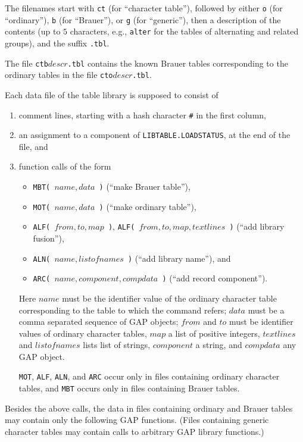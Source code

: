 \documentclass[a4paper,11pt]{report}
\begin{document}
{{{ The filenames start with \texttt{ct} (for ``character table''), followed by either \texttt{o} (for ``ordinary''), \texttt{b} (for ``Brauer''), or \texttt{g} (for ``generic''), then a description of the contents (up to $5$ characters, e.{\nobreakspace}g., \texttt{alter} for the tables of alternating and related groups), and the suffix \texttt{.tbl}. 

 The file \texttt{ctb}$descr$\texttt{.tbl} contains the known Brauer tables corresponding to the ordinary tables in the
file \texttt{cto}$descr$\texttt{.tbl}. 

 Each data file of the table library is supposed to consist of 
\begin{enumerate}
\item  comment lines, starting with a hash character \texttt{\#} in the first column, 
\item  an assignment to a component of \texttt{LIBTABLE.LOADSTATUS}, at the end of the file, and 
\item  function calls of the form 
\begin{itemize}
\item  \texttt{MBT( }$name, data$\texttt{ )} (``make Brauer table''), 
\item  \texttt{MOT( }$name, data$\texttt{ )} (``make ordinary table''), 
\item  \texttt{ALF( }$from, to, map$\texttt{ )}, \texttt{ALF( }$from, to, map, textlines$\texttt{ )} (``add library fusion''), 
\item  \texttt{ALN( }$name, listofnames$\texttt{ )} (``add library name''), and 
\item  \texttt{ARC( }$name, component, compdata$\texttt{ )} (``add record component''). 
\end{itemize}
 

 Here $name$ must be the identifier value of the ordinary character table corresponding to
the table to which the command refers; $data$ must be a comma separated sequence of \textsf{GAP} objects; $from$ and $to$ must be identifier values of ordinary character tables, $map$ a list of positive integers, $textlines$ and $listofnames$ lists list of strings, $component$ a string, and $compdata$ any \textsf{GAP} object. 

 \texttt{MOT}, \texttt{ALF}, \texttt{ALN}, and \texttt{ARC} occur only in files containing ordinary character tables, and \texttt{MBT} occurs only in files containing Brauer tables. 
\end{enumerate}
 

 Besides the above calls, the data in files containing ordinary and Brauer
tables may contain only the following \textsf{GAP} functions. (Files containing generic character tables may contain calls to
arbitrary \textsf{GAP} library functions.) 

}}}
\end{document}
